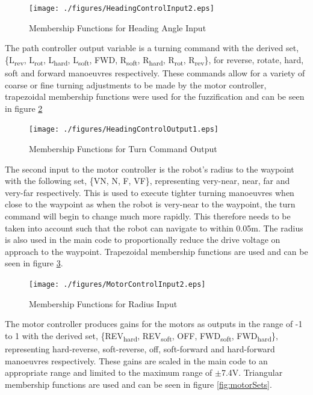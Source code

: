 \documentclass[10pt]{article}
\begin{document}
\begin{figure}[H]
    \centering
\texttt{[image: ./figures/HeadingControlInput2.eps]}
\caption{Membership Functions for Heading Angle Input}
\label{fig:headingSets}
\end{figure}

The path controller output variable is a turning command with the derived set, 
\{L\textsubscript{rev}, L\textsubscript{rot}, L\textsubscript{hard}, L\textsubscript{soft}, FWD, R\textsubscript{soft}, R\textsubscript{hard}, R\textsubscript{rot}, R\textsubscript{rev}\},
for reverse, rotate, hard, soft and forward manoeuvres respectively. 
These commands allow for a variety of coarse or fine turning adjustments to be made by the motor controller, trapezoidal membership functions were used for the fuzzification and can be seen in figure \ref{fig:commandSets}
\begin{figure}[H]
    \centering
\texttt{[image: ./figures/HeadingControlOutput1.eps]}
\caption{Membership Functions for Turn Command Output}
\label{fig:commandSets}
\end{figure}

The second input to the motor controller is the robot's radius to the waypoint with the following set, \{VN, N, F, VF\}, representing very-near, near, far and very-far respectively.
This is used to execute tighter turning manoeuvres when close to the waypoint as when the robot is very-near to the waypoint, the turn command will begin to change much more rapidly.
This therefore needs to be taken into account such that the robot can navigate to within 0.05m.
The radius is also used in the main code to proportionally reduce the drive voltage on approach to the waypoint.
Trapezoidal membership functions are used and can be seen in figure \ref{fig:radiusSets}.

\begin{figure}[H]
    \centering
\texttt{[image: ./figures/MotorControlInput2.eps]}
\caption{Membership Functions for Radius Input}
\label{fig:radiusSets}
\end{figure}

The motor controller produces gains for the motors as outputs in the range of -1 to 1 with the derived set, \{REV\textsubscript{hard}, REV\textsubscript{soft}, OFF, FWD\textsubscript{soft}, FWD\textsubscript{hard}\},
representing hard-reverse, soft-reverse, off, soft-forward and hard-forward manoeuvres respectively. 
These gains are scaled in the main code to an appropriate range and limited to the maximum range of $\pm$7.4V. 
Triangular membership functions are used and can be seen in figure \ref{fig:motorSets}.
\end{document}

